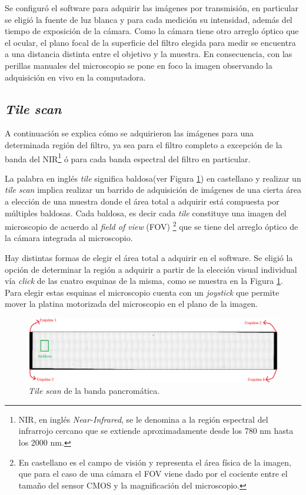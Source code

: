 \documentclass{ctuthesis}
\begin{document}
Se configuró el software para adquirir las imágenes por transmisión, en particular se eligió la fuente de luz blanca y para cada medición su intensidad, además del tiempo de exposición de la cámara. Como la cámara tiene otro arreglo óptico que el ocular, el plano focal de la superficie del filtro elegida para medir se encuentra a una distancia distinta entre el objetivo y la muestra. En consecuencia, con las perillas manuales del microscopio se pone en foco la imagen observando la adquisición en vivo en la computadora.

\singlespacing
\subsection*{\textit{Tile scan}}

\hspace{0.5cm}A continuación se explica cómo se adquirieron las imágenes para una determinada región del filtro, ya sea para el filtro completo a excepción de la banda del NIR\footnote{NIR, en inglés \textit{Near-Infrared}, se le denomina a la región espectral del infrarrojo cercano que se extiende aproximadamente desde los 780 nm hasta los 2000 nm.} ó para cada banda espectral del filtro en particular.

La palabra en inglés \textit{tile} significa baldosa(ver Figura \ref{fig:tilescan}) en castellano y realizar un \textit{tile scan} implica realizar un barrido de adquisición de imágenes de una cierta área a elección de una muestra donde el área total a adquirir está compuesta por múltiples baldosas. Cada baldosa, es decir cada \textit{tile} constituye una imagen del microscopio de acuerdo al \textit{field of view} (FOV) \footnote{En castellano es el campo de visión y representa el área física de la imagen, que para el caso de una cámara el FOV viene dado por el cociente entre el tamaño del sensor CMOS y la magnificación del microscopio.} que se tiene del arreglo óptico de la cámara integrada al microscopio.

Hay distintas formas de elegir el área total a adquirir en el software. Se eligió la opción de determinar la región a adquirir a partir de la elección visual individual vía \textit{click} de las cuatro esquinas de la misma, como se muestra en la Figura \ref{fig:tilescan}. Para elegir estas esquinas el microscopio cuenta con un \textit{joystick} que permite mover la platina motorizada del microscopio en el plano de la imagen.

\begin{figure}[!h]
	\centering
	\includegraphics[width=1.0\textwidth]{Figs/cuantificaciondefectos/tilescan.png}
	\caption{\textit{Tile scan} de la banda pancromática.}
	\label{fig:tilescan}
\end{figure} 
\end{document}
